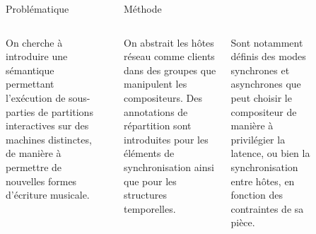 \begin{columns}[t]
   \begin{column}{\sepwid}\end{column}
     \begin{column}{\onecolwid}
      \begin{block}{Problématique}
          \begin{columns}[t]
              \begin{column}{\onecolwid}\justify
                  On cherche à introduire une sémantique permettant l'exécution de sous-parties de partitions interactives sur des machines distinctes, de manière à permettre de nouvelles formes d'écriture musicale.
                \end{column}
            \end{columns}        
      \end{block}
     \end{column}
     \begin{column}{\sepwid}\end{column}
     \begin{column}{\twocolwid}
         \begin{block}{Méthode}             
             \begin{columns}[t]	                 
                 \begin{column}{\onecolwid}\justify
                     On abstrait les hôtes réseau comme clients dans des groupes que manipulent les compositeurs. Des annotations de répartition sont introduites pour les éléments de synchronisation ainsi que pour les structures temporelles.
                     \end{column}
                     \begin{column}{\onecolwid}\justify
                     Sont notamment définis des modes synchrones et asynchrones que peut choisir le compositeur de manière à privilégier la latence, ou bien la synchronisation entre hôtes, en fonction des contraintes de sa pièce.
                        \end{column}
                \end{columns}                 
            \end{block}
      \end{column}
      \begin{column}{\sepwid}\end{column}
      \begin{column}{\onecolwid}

\end{column}
\end{columns}
